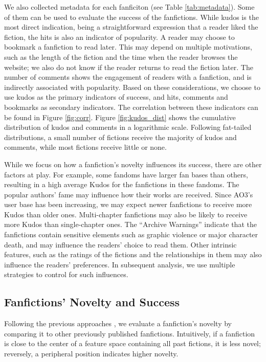 \documentclass[letterpaper]{article} %
\begin{document}
We also collected metadata for each fanficiton (see Table \ref{tab:metadata}). Some of them can be used to evaluate the success of the fanfictions. While kudos is the most direct indication, being a straightforward expression that a reader liked the fiction, the hits is also an indicator of popularity. A reader may choose to bookmark a fanfiction to read later. This may depend on multiple motivations, such as the length of the fiction and the time when the reader browses the website; we also do not know if the reader returns to read the fiction later. The number of comments shows the engagement of readers with a fanfiction, and is indirectly associated with popularity. Based on these considerations, we choose to use kudos as the primary indicators of success, and hits, comments and bookmarks as secondary indicators. The correlation between these indicators can be found in Figure \ref{fig:corr}. Figure \ref{fig:kudos_dist} shows the cumulative distribution of kudos and comments in a logarithmic scale. Following fat-tailed distributions, a small number of fictions receive the majority of kudos and comments, while most fictions receive little or none. 

While we focus on how a fanfiction's novelty influences its success, there are other factors at play. For example, some fandoms have larger fan bases than others, resulting in a high average Kudos for the fanfictions in these fandoms. The popular authors' fame may influence how their works are received. Since AO3's user base has been increasing, we may expect newer fanfictions to receive more Kudos than older ones. Multi-chapter fanfictions may also be likely to receive more Kudos than single-chapter ones. The ``Archive Warnings'' indicate that the fanfictions contain sensitive elements such as graphic violence or major character death, and may influence the readers' choice to read them. Other intrinsic features, such as the ratings of the fictions and the relationships in them may also influence the readers' preferences. In subsequent analysis, we use multiple strategies to control for such influences.


\subsection*{Fanfictions' Novelty and Success}
Following the previous approaches \cite{askin2017makes} \cite{de2015game}, we evaluate a fanfiction's novelty by comparing it to other previously published fanfictions. Intuitively, if a fanfiction is close to the center of a feature space containing all past fictions, it is less novel; reversely, a peripheral position indicates higher novelty. 
\end{document}
